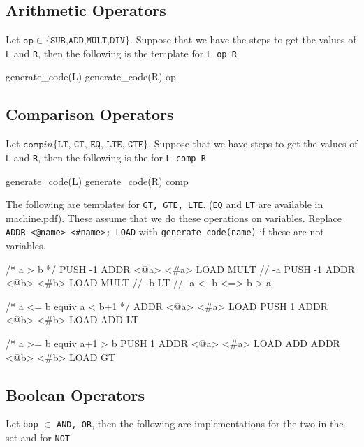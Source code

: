 \subsection{Arithmetic Operators}
Let $\texttt{op} \in \{\texttt{SUB,ADD,MULT,DIV}\}$. Suppose that we have the
steps to get the values of \texttt{L} and \texttt{R}, then the following is the
template for \texttt{L op R}

\begin{code}
generate_code(L)
generate_code(R)
op
\end{code}

\subsection{Comparison Operators}

Let $\texttt{comp} in \{\texttt{LT, GT, EQ, LTE, GTE}\}$. Suppose that we have
steps to get the values of \texttt{L} and \texttt{R}, then the following is the
for \texttt{L comp R}

\begin{code}
generate_code(L)
generate_code(R)
comp
\end{code}


The following are templates for \texttt{GT, GTE, LTE}. (\texttt{EQ} and
\texttt{LT} are available in machine.pdf). These assume that we do these
operations on variables. Replace \texttt{ADDR <@name> <\#name>; LOAD} with 
\texttt{generate\_code(name)} if these are not variables.


\begin{code}[GT]
/* a > b */
PUSH -1
ADDR <@a> <#a>
LOAD
MULT            // -a
PUSH -1
ADDR <@b> <#b>
LOAD
MULT            // -b
LT              // -a < -b <=> b > a
\end{code}

\begin{code}[LTE]
/* a <= b equiv a < b+1 */
ADDR <@a> <#a>
LOAD
PUSH 1
ADDR <@b> <#b>
LOAD
ADD
LT
\end{code}

\begin{code}[GTE]
/* a >= b equiv a+1 > b
PUSH 1
ADDR <@a> <#a>
LOAD
ADD
ADDR <@b> <#b>
LOAD
GT
\end{code}

\subsection{Boolean Operators}
Let \texttt{bop} $\in$ \texttt{AND, OR}, then the following are implementations
for the two in the set and for \texttt{NOT}


